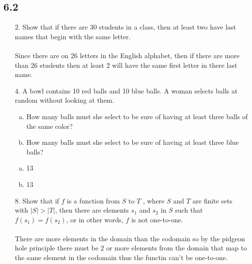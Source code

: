 \subsection{6.2}
\begin{itemize}
    \item[2.]  Show that if there are 30 students in a class, then at least
          two have last names that begin with the same letter. \\
          \answer \\
          Since there are on 26 letters in the English alphabet, then if there are more
          than 26 students then at least 2 will have the same first letter in there last name.

    \item[4.] A bowl contains 10 red balls and 10 blue balls. A woman
          selects balls at random without looking at them.
          \begin{enumerate}[a.]
              \item How many balls must she select to be sure of having at least three balls of the same color?
              \item How many balls must she select to be sure of having at least three blue balls?
          \end{enumerate}
          \answer
          \begin{enumerate}[a.]
              \item 13
              \item 13
          \end{enumerate}

    \item[8.]  Show that if $f$ is a function from $S$ to $T$ , where $S$ and $T$
          are finite sets with $|S| > |T|$, then there are elements $s_1$
          and $s_2$ in $S$ such that $f(s_1 ) = f (s_2)$, or in other words, $f$
          is not one-to-one. \\
          \answer \\
          There are more elements in the domain than the codomain so by the pidgeon hole
          principle there must be 2 or more elements from the domain that map to the
          same element in the codomain thus the functin can't be one-to-one.


\end{itemize}
